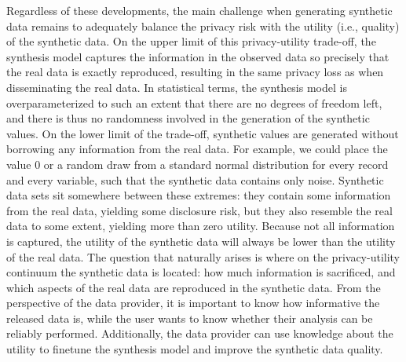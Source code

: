 \documentclass[
]{template/style/uneceart}
\begin{document}
Regardless of these developments, the main challenge when generating
synthetic data remains to adequately balance the privacy risk with the
utility (i.e., quality) of the synthetic data. On the upper limit of
this privacy-utility trade-off, the synthesis model captures the
information in the observed data so precisely that the real data is
exactly reproduced, resulting in the same privacy loss as when
disseminating the real data. In statistical terms, the synthesis model
is overparameterized to such an extent that there are no degrees of
freedom left, and there is thus no randomness involved in the generation
of the synthetic values. On the lower limit of the trade-off, synthetic
values are generated without borrowing any information from the real
data. For example, we could place the value \(0\) or a random draw from
a standard normal distribution for every record and every variable, such
that the synthetic data contains only noise. Synthetic data sets sit
somewhere between these extremes: they contain some information from the
real data, yielding some disclosure risk, but they also resemble the
real data to some extent, yielding more than zero utility. Because not
all information is captured, the utility of the synthetic data will
always be lower than the utility of the real data. The question that
naturally arises is where on the privacy-utility continuum the synthetic
data is located: how much information is sacrificed, and which aspects
of the real data are reproduced in the synthetic data. From the
perspective of the data provider, it is important to know how
informative the released data is, while the user wants to know whether
their analysis can be reliably performed. Additionally, the data
provider can use knowledge about the utility to finetune the synthesis
model and improve the synthetic data quality.
\end{document}
